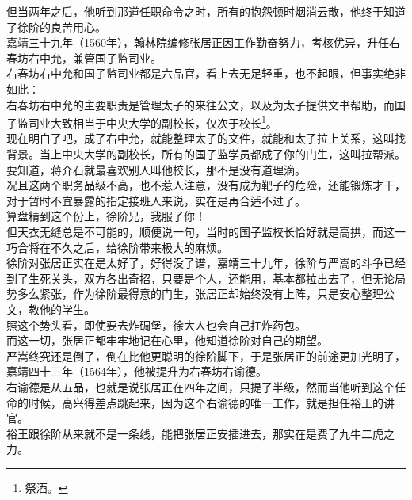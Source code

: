 \begin{multicols}{\theparacolNo}
但当两年之后，他听到那道任职命令之时，所有的抱怨顿时烟消云散，他终于知道了徐阶的良苦用心。\\

嘉靖三十九年（1560年），翰林院编修张居正因工作勤奋努力，考核优异，升任右春坊右中允，兼管国子监司业。\\

右春坊右中允和国子监司业都是六品官，看上去无足轻重，也不起眼，但事实绝非如此：\\

右春坊右中允的主要职责是管理太子的来往公文，以及为太子提供文书帮助，而国子监司业大致相当于中央大学的副校长，仅次于校长\footnote{祭酒。}。\\

现在明白了吧，成了右中允，就能整理太子的文件，就能和太子拉上关系，这叫找背景。当上中央大学的副校长，所有的国子监学员都成了你的门生，这叫拉帮派。要知道，蒋介石就最喜欢别人叫他校长，那不是没有道理滴。\\

况且这两个职务品级不高，也不惹人注意，没有成为靶子的危险，还能锻炼才干，对于暂时不宜暴露的指定接班人来说，实在是再合适不过了。\\

算盘精到这个份上，徐阶兄，我服了你！\\

但天衣无缝总是不可能的，顺便说一句，当时的国子监校长恰好就是高拱，而这一巧合将在不久之后，给徐阶带来极大的麻烦。\\

徐阶对张居正实在是太好了，好得没了谱，嘉靖三十九年，徐阶与严嵩的斗争已经到了生死关头，双方各出奇招，只要是个人，还能用，基本都拉出去了，但无论局势多么紧张，作为徐阶最得意的门生，张居正却始终没有上阵，只是安心整理公文，教他的学生。\\

照这个势头看，即使要去炸碉堡，徐大人也会自己扛炸药包。\\

而这一切，张居正都牢牢地记在心里，他知道徐阶对自己的期望。\\

严嵩终究还是倒了，倒在比他更聪明的徐阶脚下，于是张居正的前途更加光明了，嘉靖四十三年（1564年），他被提升为右春坊右谕德。\\

右谕德是从五品，也就是说张居正在四年之间，只提了半级，然而当他听到这个任命的时候，高兴得差点跳起来，因为这个右谕德的唯一工作，就是担任裕王的讲官。\\

裕王跟徐阶从来就不是一条线，能把张居正安插进去，那实在是费了九牛二虎之力。\\


\end{multicols}
